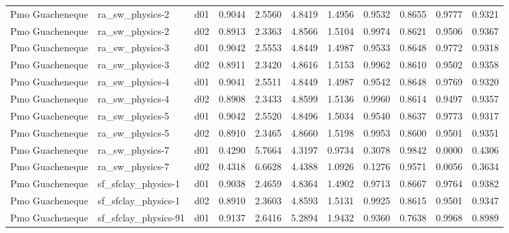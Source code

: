 \begin{longtable}{lllrrrrrrrr}
      Pmo Guacheneque  &       ra\_sw\_physics-2 &     d01 &   0.9044 &   2.5560 &   4.8419 &       1.4956 &        0.9532 &       0.8655 &           0.9777 &  0.9321 \\
      Pmo Guacheneque  &       ra\_sw\_physics-2 &     d02 &   0.8913 &   2.3363 &   4.8566 &       1.5104 &        0.9974 &       0.8621 &           0.9506 &  0.9367 \\
      Pmo Guacheneque  &       ra\_sw\_physics-3 &     d01 &   0.9042 &   2.5553 &   4.8449 &       1.4987 &        0.9533 &       0.8648 &           0.9772 &  0.9318 \\
      Pmo Guacheneque  &       ra\_sw\_physics-3 &     d02 &   0.8911 &   2.3420 &   4.8616 &       1.5153 &        0.9962 &       0.8610 &           0.9502 &  0.9358 \\
      Pmo Guacheneque  &       ra\_sw\_physics-4 &     d01 &   0.9041 &   2.5511 &   4.8449 &       1.4987 &        0.9542 &       0.8648 &           0.9769 &  0.9320 \\
      Pmo Guacheneque  &       ra\_sw\_physics-4 &     d02 &   0.8908 &   2.3433 &   4.8599 &       1.5136 &        0.9960 &       0.8614 &           0.9497 &  0.9357 \\
      Pmo Guacheneque  &       ra\_sw\_physics-5 &     d01 &   0.9042 &   2.5520 &   4.8496 &       1.5034 &        0.9540 &       0.8637 &           0.9773 &  0.9317 \\
      Pmo Guacheneque  &       ra\_sw\_physics-5 &     d02 &   0.8910 &   2.3465 &   4.8660 &       1.5198 &        0.9953 &       0.8600 &           0.9501 &  0.9351 \\
      Pmo Guacheneque  &       ra\_sw\_physics-7 &     d01 &   0.4290 &   5.7664 &   4.3197 &       0.9734 &        0.3078 &       0.9842 &           0.0000 &  0.4306 \\
      Pmo Guacheneque  &       ra\_sw\_physics-7 &     d02 &   0.4318 &   6.6628 &   4.4388 &       1.0926 &        0.1276 &       0.9571 &           0.0056 &  0.3634 \\
      Pmo Guacheneque  &   sf\_sfclay\_physics-1 &     d01 &   0.9038 &   2.4659 &   4.8364 &       1.4902 &        0.9713 &       0.8667 &           0.9764 &  0.9382 \\
      Pmo Guacheneque  &   sf\_sfclay\_physics-1 &     d02 &   0.8910 &   2.3603 &   4.8593 &       1.5131 &        0.9925 &       0.8615 &           0.9501 &  0.9347 \\
      Pmo Guacheneque  &  sf\_sfclay\_physics-91 &     d01 &   0.9137 &   2.6416 &   5.2894 &       1.9432 &        0.9360 &       0.7638 &           0.9968 &  0.8989 \\

\end{longtable}
